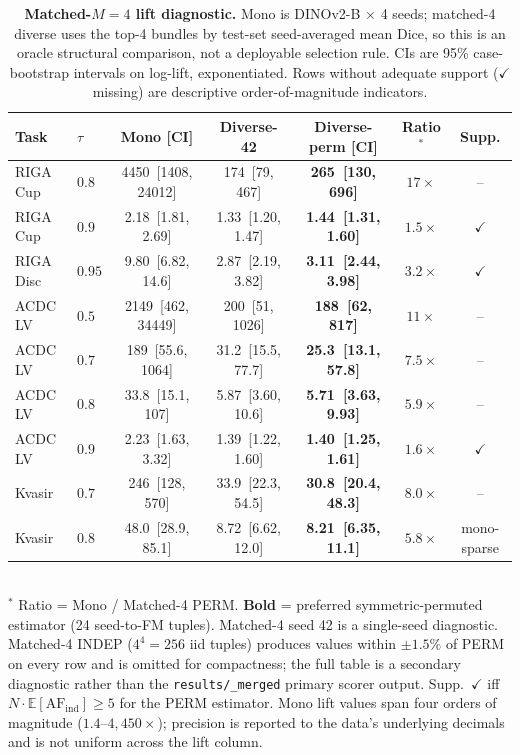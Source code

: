 \begin{table}[!htbp]
  \caption{\textbf{Matched-$M{=}4$ lift diagnostic.} Mono is DINOv2-B $\times$ 4 seeds; matched-4 diverse uses the top-4 bundles by test-set seed-averaged mean Dice, so this is an oracle structural comparison, not a deployable selection rule. CIs are 95\% case-bootstrap intervals on log-lift, exponentiated. Rows without adequate support ($\checkmark$ missing) are descriptive order-of-magnitude indicators.}
  \label{tab:matched}
  \centering\scriptsize
  \setlength{\tabcolsep}{2.5pt}
  \begin{tabular*}{\linewidth}{@{\extracolsep{\fill}}llccccc}
    \toprule
    Task & $\tau$ & Mono [CI] & Diverse-42 & Diverse-perm [CI] & Ratio$^{*}$ & Supp. \\
    \midrule
    RIGA Cup  & $0.8$  & 4450~[1408, 24012] & 174~[79, 467] & \textbf{265~[130, 696]}   & $17{\times}$ & -- \\
    RIGA Cup  & $0.9$  & 2.18~[1.81, 2.69]  & 1.33~[1.20, 1.47] & \textbf{1.44~[1.31, 1.60]} & $1.5{\times}$ & $\checkmark$ \\
    RIGA Disc & $0.95$ & 9.80~[6.82, 14.6]  & 2.87~[2.19, 3.82] & \textbf{3.11~[2.44, 3.98]} & $3.2{\times}$ & $\checkmark$ \\
    ACDC LV   & $0.5$  & 2149~[462, 34449]  & 200~[51, 1026]   & \textbf{188~[62, 817]}    & $11{\times}$ & -- \\
    ACDC LV   & $0.7$  & 189~[55.6, 1064]   & 31.2~[15.5, 77.7] & \textbf{25.3~[13.1, 57.8]} & $7.5{\times}$ & -- \\
    ACDC LV   & $0.8$  & 33.8~[15.1, 107]   & 5.87~[3.60, 10.6] & \textbf{5.71~[3.63, 9.93]} & $5.9{\times}$ & -- \\
    ACDC LV   & $0.9$  & 2.23~[1.63, 3.32]  & 1.39~[1.22, 1.60] & \textbf{1.40~[1.25, 1.61]} & $1.6{\times}$ & $\checkmark$ \\
    Kvasir    & $0.7$  & 246~[128, 570]     & 33.9~[22.3, 54.5] & \textbf{30.8~[20.4, 48.3]} & $8.0{\times}$ & -- \\
    Kvasir    & $0.8$  & 48.0~[28.9, 85.1]  & 8.72~[6.62, 12.0] & \textbf{8.21~[6.35, 11.1]} & $5.8{\times}$ & mono-sparse \\
    \bottomrule
  \end{tabular*}
  \\[2pt]
  {\footnotesize $^{*}$ Ratio = Mono / Matched-4 PERM. \textbf{Bold} = preferred symmetric-permuted estimator (24 seed-to-FM tuples). Matched-4 seed 42 is a single-seed diagnostic. Matched-4 INDEP ($4^4{=}256$ iid tuples) produces values within $\pm 1.5\%$ of PERM on every row and is omitted for compactness; the full table is a secondary diagnostic rather than the \texttt{results/\_merged} primary scorer output. Supp.\ $\checkmark$ iff $N\cdot\mathbb{E}[\mathrm{AF}_{\mathrm{ind}}]{\geq}5$ for the PERM estimator. Mono lift values span four orders of magnitude ($1.4$--$4{,}450{\times}$); precision is reported to the data's underlying decimals and is not uniform across the lift column.}
\end{table}

